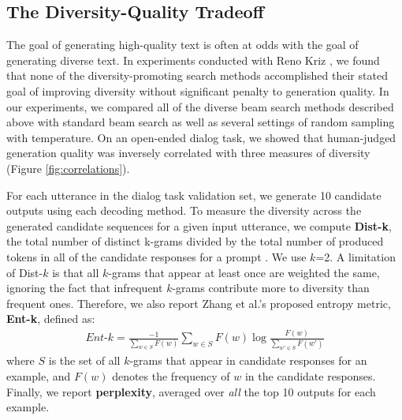 \begin{itemize}
\subsection{The Diversity-Quality Tradeoff}
The goal of generating high-quality text is often at odds with the goal of generating diverse text.
In experiments conducted with Reno Kriz \citep{ippolito2019comparison}, we found that none of the diversity-promoting search methods accomplished their stated goal of improving diversity without significant penalty to generation quality.
In our experiments, we compared all of the diverse beam search methods described above with standard beam search as well as several settings of random sampling with temperature.
On an open-ended dialog task, we showed that human-judged generation quality was inversely correlated with three measures of diversity (Figure \ref{fig:correlations}).

For each utterance in the dialog task validation set, we generate 10 candidate outputs using each decoding method.
To measure the diversity across the generated candidate sequences for a given input utterance, we compute \textbf{Dist-k}, the total number of distinct k-grams divided by the total number of produced tokens in all of the candidate responses for a prompt \citep{li2016diversity}. 
We use $k$=2.
A limitation of Dist-$k$ is that all $k$-grams that appear at least once are weighted the same, ignoring the fact that infrequent $k$-grams contribute more to diversity than frequent ones. 
Therefore, we also report Zhang et al.'s \citep{zhang2018generating} proposed entropy metric, \textbf{Ent-k}, defined as:
 \begin{align*}
 \textit{Ent-k} = \frac{-1} {\sum_{w \in S}F(w)} \sum_{w \in S} F(w) \log \frac{F(w)} {\sum_{w' \in S} F(w')}
 \end{align*}
 where $S$ is the set of all $k$-grams that appear in candidate responses for an example, and $F(w)$ denotes the frequency of $w$ in the candidate responses.
Finally, we report \textbf{perplexity}, averaged over \textit{all} the top 10 outputs for each example.


\end{itemize}
